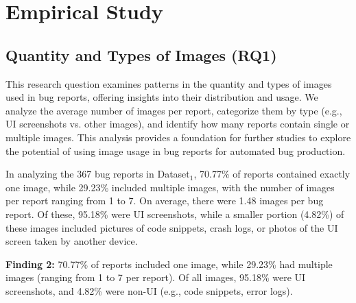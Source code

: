\section{Empirical Study}


\subsection{Quantity and Types of Images (RQ1)}
This research question examines patterns in the quantity and types of images used in bug reports, offering insights into their distribution and usage. We analyze the average number of images per report, categorize them by type (e.g., UI screenshots vs. other images), and identify how many reports contain single or multiple images. This analysis provides a foundation for further studies to explore the potential of using image usage in bug reports for automated bug production.
%

In analyzing the 367 bug reports in Dataset$_1$, 70.77\% of reports contained exactly one image, while 29.23\% included multiple images, with the number of images per report ranging from 1 to 7. On average, there were 1.48 images per bug report. Of these, 95.18\% were UI screenshots, while a smaller portion (4.82\%) of these images included pictures of code snippets, crash logs, or photos of the UI screen taken by another device. 


 



\begin{tcolorbox}[colback=blue!5, colframe=black, boxrule=0.5pt]
%
\textbf{Finding 2:} 70.77\% of reports included one image, while 29.23\% had multiple images (ranging from 1 to 7 per report). Of all images, 95.18\% were UI screenshots, and 4.82\% were non-UI (e.g., code snippets, error logs).

%
\end{tcolorbox}

